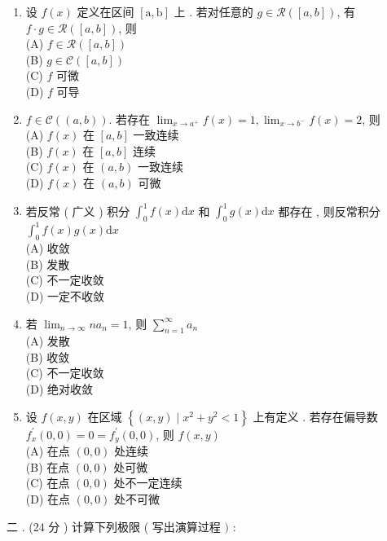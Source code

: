 \documentclass[10pt]{article}
\begin{document}
\begin{enumerate}
  \item  设  $f(x)$  定义在区间  $[\mathrm{a}, \mathrm{b}]$  上 .  若对任意的  $g \in \mathcal{R}([a, b])$,  有  $f \cdot g \in \mathcal{R}([a, b])$,  则 \\
(A) $f \in \mathcal{R}([a, b])$\\
(B) $g \in \mathcal{C}([a, b])$\\
(C) $f$  可微 \\
(D) $f$  可导 

  \item $f \in \mathcal{C}((a, b))$.  若存在  $\lim _{x \rightarrow a^{+}} f(x)=1, \lim _{x \rightarrow b^{-}} f(x)=2$,  则 \\
(A) $f(x)$  在  $[a, b]$  一致连续 \\
(B) $f(x)$  在  $[a, b]$  连续 \\
(C) $f(x)$  在  $(a, b)$  一致连续 \\
(D) $f(x)$  在  $(a, b)$  可微 

  \item  若反常  ( 广义 )  积分  $\int_{0}^{1} f(x) \mathrm{d} x$  和  $\int_{0}^{1} g(x) \mathrm{d} x$  都存在 ,  则反常积分  $\int_{0}^{1} f(x) g(x) \mathrm{d} x$\\
(A)  收敛 \\
(B)  发散 \\
(C)  不一定收敛 \\
(D)  一定不收敛 

  \item  若  $\lim _{n \rightarrow \infty} n a_{n}=1$,  则  $\sum_{n=1}^{\infty} a_{n}$\\
(A)  发散 \\
(B)  收敛 \\
(C)  不一定收敛 \\
(D)  绝对收敛 

  \item  设  $f(x, y)$  在区域  $\left\{(x, y) \mid x^{2}+y^{2}<1\right\}$  上有定义 .  若存在偏导数  $f_{x}^{\prime}(0,0)=0=f_{y}^{\prime}(0,0)$,  则  $f(x, y)$\\
(A)  在点  $(0,0)$  处连续 \\
(B)  在点  $(0,0)$  处可微 \\
(C)  在点  $(0,0)$  处不一定连续 \\
(D)  在点  $(0,0)$  处不可微 

\end{enumerate}
 二 . (24  分 )  计算下列极限  ( 写出演算过程  $)$ :
\end{document}
